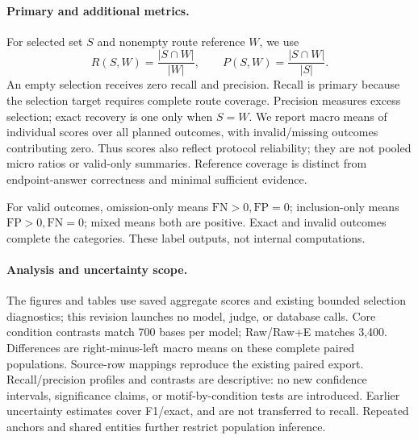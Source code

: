 \paragraph{Primary and additional metrics.}
For selected set $S$ and nonempty route reference $W$, we use
\begin{equation}
 R(S,W)=\frac{|S\cap W|}{|W|},\qquad
 P(S,W)=\frac{|S\cap W|}{|S|}.
\end{equation}
An empty selection receives zero recall and precision. Recall is primary because the selection target requires complete route coverage. Precision measures excess selection; exact recovery is one only when $S=W$. We report macro means of individual scores over all planned outcomes, with invalid/missing outcomes contributing zero. Thus scores also reflect protocol reliability; they are not pooled micro ratios or valid-only summaries. Reference coverage is distinct from endpoint-answer correctness and minimal sufficient evidence.

For valid outcomes, omission-only means $\mathrm{FN}>0,\mathrm{FP}=0$; inclusion-only means $\mathrm{FP}>0,\mathrm{FN}=0$; mixed means both are positive. Exact and invalid outcomes complete the categories. These label outputs, not internal computations.

\paragraph{Analysis and uncertainty scope.}
The figures and tables use saved aggregate scores and existing bounded selection diagnostics; this revision launches no model, judge, or database calls. Core condition contrasts match 700 bases per model; Raw/Raw+E matches 3,400. Differences are right-minus-left macro means on these complete paired populations. Source-row mappings reproduce the existing paired export. Recall/precision profiles and contrasts are descriptive: no new confidence intervals, significance claims, or motif-by-condition tests are introduced. Earlier uncertainty estimates cover F1/exact, and are not transferred to recall. Repeated anchors and shared entities further restrict population inference.
